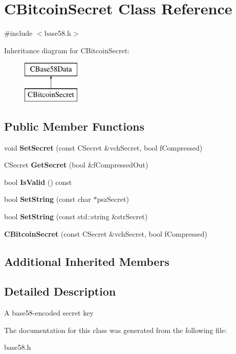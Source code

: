 \hypertarget{class_c_bitcoin_secret}{}\section{C\+Bitcoin\+Secret Class Reference}
\label{class_c_bitcoin_secret}


{\ttfamily \#include $<$base58.\+h$>$}

Inheritance diagram for C\+Bitcoin\+Secret\+:\begin{figure}[H]
\begin{center}
\leavevmode
\includegraphics[height=2.000000cm]{class_c_bitcoin_secret}
\end{center}
\end{figure}
\subsection*{Public Member Functions}
\begin{DoxyCompactItemize}
\item 
\mbox{\label{class_c_bitcoin_secret_a5bfecc2bd9437c2d4dfbc108fcacc476}} 
void {\bfseries Set\+Secret} (const C\+Secret \&vch\+Secret, bool f\+Compressed)
\item 
\mbox{\label{class_c_bitcoin_secret_a83f91472ad3397a4769e23c030434a69}} 
C\+Secret {\bfseries Get\+Secret} (bool \&f\+Compressed\+Out)
\item 
\mbox{\label{class_c_bitcoin_secret_a2a93fa8a09826ff63498cb3e4370c154}} 
bool {\bfseries Is\+Valid} () const
\item 
\mbox{\label{class_c_bitcoin_secret_a6a8aff02f66099f33f573ad3e6375bb1}} 
bool {\bfseries Set\+String} (const char $\ast$psz\+Secret)
\item 
\mbox{\label{class_c_bitcoin_secret_a83cfc3b34aac494efdd6e316cd08626d}} 
bool {\bfseries Set\+String} (const std\+::string \&str\+Secret)
\item 
\mbox{\label{class_c_bitcoin_secret_aae0ec3f85b384b5cbaa12004f3ce8d72}} 
{\bfseries C\+Bitcoin\+Secret} (const C\+Secret \&vch\+Secret, bool f\+Compressed)
\end{DoxyCompactItemize}
\subsection*{Additional Inherited Members}


\subsection{Detailed Description}
A base58-\/encoded secret key 

The documentation for this class was generated from the following file\+:\begin{DoxyCompactItemize}
\item 
base58.\+h\end{DoxyCompactItemize}
